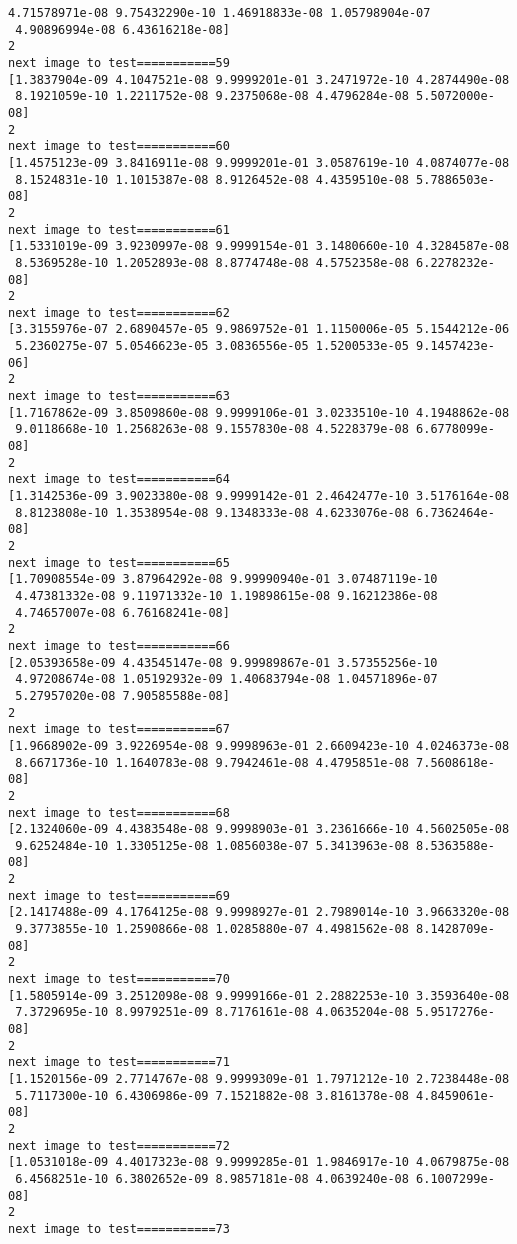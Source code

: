 \documentclass[11pt]{article}
\begin{document}
\begin{Verbatim}[commandchars=\\\{\}]
 4.71578971e-08 9.75432290e-10 1.46918833e-08 1.05798904e-07
 4.90896994e-08 6.43616218e-08]
2
next image to test===========59
[1.3837904e-09 4.1047521e-08 9.9999201e-01 3.2471972e-10 4.2874490e-08
 8.1921059e-10 1.2211752e-08 9.2375068e-08 4.4796284e-08 5.5072000e-08]
2
next image to test===========60
[1.4575123e-09 3.8416911e-08 9.9999201e-01 3.0587619e-10 4.0874077e-08
 8.1524831e-10 1.1015387e-08 8.9126452e-08 4.4359510e-08 5.7886503e-08]
2
next image to test===========61
[1.5331019e-09 3.9230997e-08 9.9999154e-01 3.1480660e-10 4.3284587e-08
 8.5369528e-10 1.2052893e-08 8.8774748e-08 4.5752358e-08 6.2278232e-08]
2
next image to test===========62
[3.3155976e-07 2.6890457e-05 9.9869752e-01 1.1150006e-05 5.1544212e-06
 5.2360275e-07 5.0546623e-05 3.0836556e-05 1.5200533e-05 9.1457423e-06]
2
next image to test===========63
[1.7167862e-09 3.8509860e-08 9.9999106e-01 3.0233510e-10 4.1948862e-08
 9.0118668e-10 1.2568263e-08 9.1557830e-08 4.5228379e-08 6.6778099e-08]
2
next image to test===========64
[1.3142536e-09 3.9023380e-08 9.9999142e-01 2.4642477e-10 3.5176164e-08
 8.8123808e-10 1.3538954e-08 9.1348333e-08 4.6233076e-08 6.7362464e-08]
2
next image to test===========65
[1.70908554e-09 3.87964292e-08 9.99990940e-01 3.07487119e-10
 4.47381332e-08 9.11971332e-10 1.19898615e-08 9.16212386e-08
 4.74657007e-08 6.76168241e-08]
2
next image to test===========66
[2.05393658e-09 4.43545147e-08 9.99989867e-01 3.57355256e-10
 4.97208674e-08 1.05192932e-09 1.40683794e-08 1.04571896e-07
 5.27957020e-08 7.90585588e-08]
2
next image to test===========67
[1.9668902e-09 3.9226954e-08 9.9998963e-01 2.6609423e-10 4.0246373e-08
 8.6671736e-10 1.1640783e-08 9.7942461e-08 4.4795851e-08 7.5608618e-08]
2
next image to test===========68
[2.1324060e-09 4.4383548e-08 9.9998903e-01 3.2361666e-10 4.5602505e-08
 9.6252484e-10 1.3305125e-08 1.0856038e-07 5.3413963e-08 8.5363588e-08]
2
next image to test===========69
[2.1417488e-09 4.1764125e-08 9.9998927e-01 2.7989014e-10 3.9663320e-08
 9.3773855e-10 1.2590866e-08 1.0285880e-07 4.4981562e-08 8.1428709e-08]
2
next image to test===========70
[1.5805914e-09 3.2512098e-08 9.9999166e-01 2.2882253e-10 3.3593640e-08
 7.3729695e-10 8.9979251e-09 8.7176161e-08 4.0635204e-08 5.9517276e-08]
2
next image to test===========71
[1.1520156e-09 2.7714767e-08 9.9999309e-01 1.7971212e-10 2.7238448e-08
 5.7117300e-10 6.4306986e-09 7.1521882e-08 3.8161378e-08 4.8459061e-08]
2
next image to test===========72
[1.0531018e-09 4.4017323e-08 9.9999285e-01 1.9846917e-10 4.0679875e-08
 6.4568251e-10 6.3802652e-09 8.9857181e-08 4.0639240e-08 6.1007299e-08]
2
next image to test===========73

\end{Verbatim}
\end{document}
